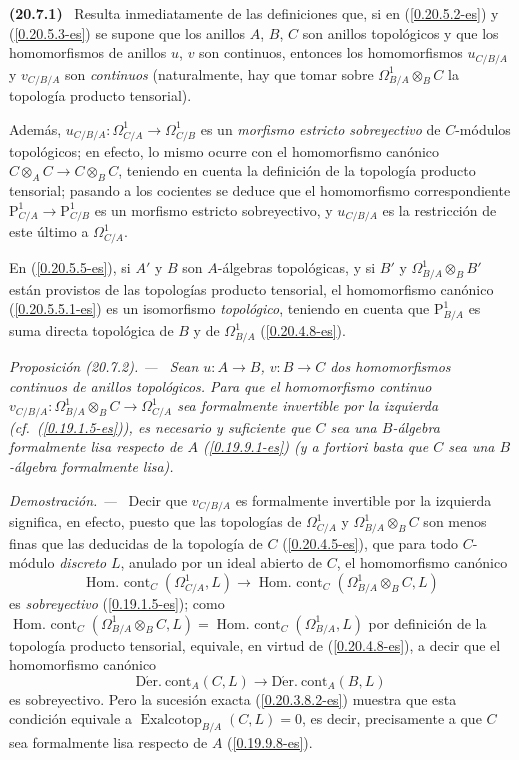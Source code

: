 \documentclass[10pt,oneside]{book}
\makeatletter
\newcommand{\sref}[1]{\textup{(\ref{#1})}}
\newcommand{\setmanualcurrentlabel}[1]{\def\@currentlabel{#1}}
\newcommand{\oldpage}[2][]{%
  \setcounter{footnote}{0}%
  \marginpar{\scriptsize\textbf{#1}~|~#2}\ignorespaces}
\newenvironment{env}[1][]{\setmanualcurrentlabel{#1}\par\medskip\noindent\textbf{(#1)}\ }{\par}
\newenvironment{proposition}[1][]{%
  \setmanualcurrentlabel{#1}\par\medskip\noindent\itshape Proposición (#1). ---\ }{\par}
\newenvironment{proof}{%
  \par\medskip\noindent\textit{Demostración. ---\ }}{\par}
\makeatother
\begin{document}
\begin{env}[20.7.1]
\label{0.20.7.1-es}
Resulta inmediatamente de las definiciones que, si en \sref{0.20.5.2-es} y
\sref{0.20.5.3-es} se supone que los anillos $A$, $B$, $C$ son anillos
topológicos y que los homomorfismos de anillos $u$, $v$ son continuos, entonces los
homomorfismos $u_{C/B/A}$ y $v_{C/B/A}$ son \emph{continuos} (naturalmente,
hay que tomar sobre $\Omega^1_{B/A}\otimes_B C$ la topología producto
tensorial).

Además, $u_{C/B/A}:\Omega^1_{C/A}\to\Omega^1_{C/B}$ es un
\emph{morfismo estricto sobreyectivo} de $C$-módulos topológicos; en efecto, lo
mismo ocurre con el homomorfismo canónico $C\otimes_A C\to C\otimes_B C$, teniendo
en cuenta la definición de la topología producto tensorial; pasando a los
cocientes se deduce que el homomorfismo correspondiente
$\mathrm{P}^1_{C/A}\to\mathrm{P}^1_{C/B}$ es un morfismo estricto sobreyectivo,
y $u_{C/B/A}$ es la restricción de este último a $\Omega^1_{C/A}$.

En \sref{0.20.5.5-es}, si $A'$ y $B$ son $A$-álgebras topológicas,
y si $B'$ y $\Omega^1_{B/A}\otimes_B B'$ están provistos de las topologías producto
tensorial, el homomorfismo canónico \sref{0.20.5.5.1-es} es un isomorfismo
\emph{topológico}, teniendo en cuenta que $\mathrm{P}^1_{B/A}$ es suma directa
topológica de $B$ y de $\Omega^1_{B/A}$ \sref{0.20.4.8-es}.
\end{env}

\begin{proposition}[20.7.2]
\label{0.20.7.2-es}
Sean $u:A\to B$, $v:B\to C$ dos homomorfismos continuos de anillos
topológicos. Para que el homomorfismo continuo
$v_{C/B/A}:\Omega^1_{B/A}\otimes_B C\to\Omega^1_{C/A}$ sea formalmente
invertible por la izquierda \textup{(cf.\ \sref{0.19.1.5-es})}, es necesario y suficiente que $C$
sea una $B$-álgebra formalmente lisa respecto de $A$
\textup{\sref{0.19.9.1-es}} \textup{(y} a fortiori \textup{basta que $C$ sea una
$B$-álgebra formalmente lisa)}.
\end{proposition}

\begin{proof}
Decir que $v_{C/B/A}$ es formalmente invertible por la izquierda significa, en efecto,
puesto que las topologías de $\Omega^1_{C/A}$ y $\Omega^1_{B/A}\otimes_B C$
son menos finas que las deducidas de la topología de $C$
\sref{0.20.4.5-es}, que para todo $C$-módulo \emph{discreto} $L$, anulado por un
ideal abierto de $C$, el homomorfismo canónico
\[
  \operatorname{Hom.\ cont}_C(\Omega^1_{C/A},L)\to
  \operatorname{Hom.\ cont}_C(\Omega^1_{B/A}\otimes_B C,L)
\]
\oldpage[0\textsubscript{IV-1}]{148}
es \emph{sobreyectivo} \sref{0.19.1.5-es}; como
$\operatorname{Hom.\ cont}_C(\Omega^1_{B/A}\otimes_B C,L)=
\operatorname{Hom.\ cont}_C(\Omega^1_{B/A},L)$ por definición de la topología
producto tensorial, equivale, en virtud de \sref{0.20.4.8-es}, a decir
que el homomorfismo canónico
\[
  \operatorname{D\acute{e}r.\ cont}_A(C,L)\to
  \operatorname{D\acute{e}r.\ cont}_A(B,L)
\]
es sobreyectivo. Pero la sucesión exacta \sref{0.20.3.8.2-es} muestra que esta
condición equivale a $\operatorname{Exalcotop}_{B/A}(C,L)=0$, es decir,
precisamente a que $C$ sea formalmente lisa respecto de $A$
\sref{0.19.9.8-es}.
\end{proof}
\end{document}
